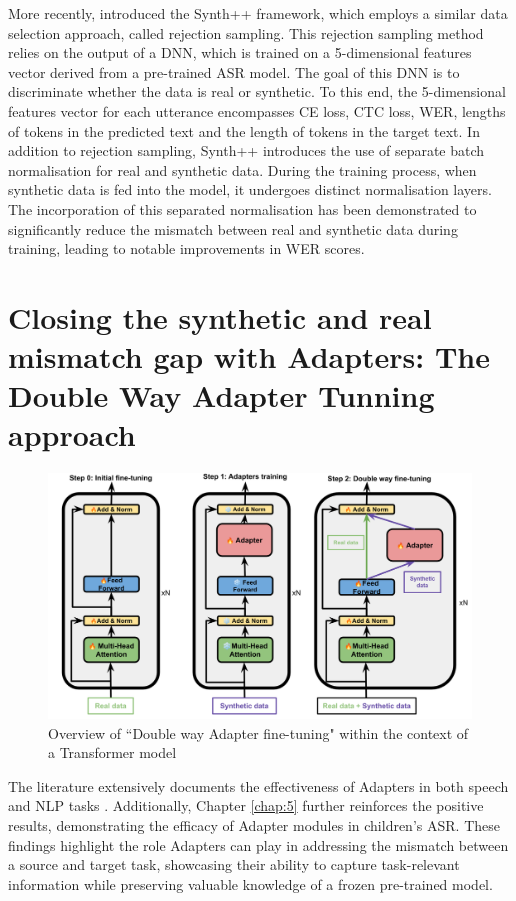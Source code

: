 More recently, \cite{hu2022synt++} introduced the Synth++ framework, which employs a similar data selection approach, called rejection sampling. This rejection sampling method relies on the output of a \ac{DNN}, which is trained on a 5-dimensional features vector derived from a pre-trained \ac{ASR} model. The goal of this \ac{DNN} is to discriminate whether the data is real or synthetic. To this end, the 5-dimensional features vector for each utterance encompasses \ac{CE} loss, \ac{CTC} loss, \ac{WER}, lengths of tokens in the predicted text and the length of tokens in the target text. In addition to rejection sampling, Synth++ introduces the use of separate batch normalisation for real and synthetic data. During the training process, when synthetic data is fed into the model, it undergoes distinct normalisation layers. The incorporation of this separated normalisation has been demonstrated to significantly reduce the mismatch between real and synthetic data during training, leading to notable improvements in \ac{WER} scores.

\section{Closing the synthetic and real mismatch gap with Adapters: The Double Way Adapter Tunning approach}

\begin{figure}
    \centering
    \includegraphics[width=\textwidth]{imgs/TTS_Transformer.png}
    \caption{Overview of ``Double way Adapter fine-tuning"  within the context of a Transformer model}
    \label{fig:overall_DWAT}
\end{figure}

The literature extensively documents the effectiveness of Adapters in both speech and \ac{NLP} tasks \cite{pfeiffer, philip2020monolingual, mao-etal-2022-unipelt}. Additionally, Chapter \ref{chap:5} further reinforces the positive results, demonstrating the efficacy of Adapter modules in children's \ac{ASR}. These findings highlight the role Adapters can play in addressing the mismatch between a source and target task, showcasing their ability to capture task-relevant information while preserving valuable knowledge of a frozen pre-trained model.

